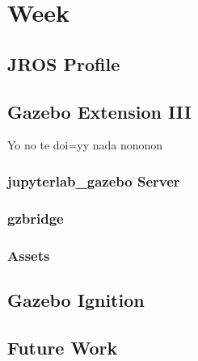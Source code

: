 \chapter{Week}

\section{JROS Profile}




\section{Gazebo Extension III}

    Yo no te doi=yy nada nononon

    \subsection{jupyterlab\_gazebo Server}
    
    \subsection{gzbridge}
    
    \subsection{Assets}
    
    
\section{Gazebo Ignition}


\section{Future Work}